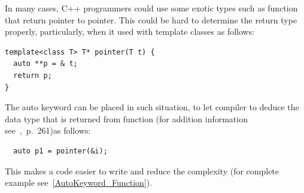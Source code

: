 \documentclass[11pt]{report}
\begin{document}
In many cases, C++ programmers could use some exotic types such as function that return pointer to pointer. This could be hard to determine the return type properly, particularly, when it used with template classes as follows:
\begin{lstlisting}
template<class T> T* pointer(T t) {
  auto **p = & t;
  return p;
}
\end{lstlisting}
The auto keyword can be placed in such situation, to let compiler to deduce the data type that is returned from function (for addition information see~\cite{Overland:2011:CWF},~p.~261)as follows:
\begin{lstlisting}
  auto p1 = pointer(&i);
\end{lstlisting}
This makes a code easier to write and reduce the complexity (for complete example see~\ref{AutoKeyword_Function}).
\end{document}
